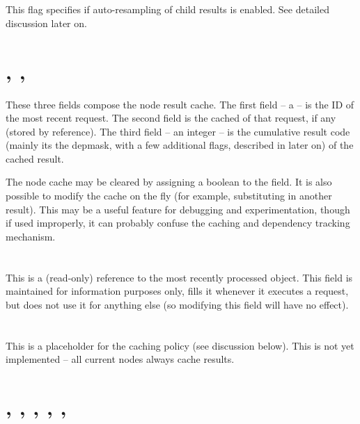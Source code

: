 \documentclass[10pt,twoside]{book}
\begin{document}
\section{}
  
  This flag specifies if auto-resampling of child results is enabled. See
  detailed discussion later on.

\section{, , }
  
  These three fields compose the node result cache. The first field -- a
   -- is the ID of the most recent request. The second field is the
  cached  of that request, if any (stored by reference). The third
  field -- an integer -- is the cumulative result code (mainly its the depmask,
  with a few additional flags, described in  later on) of the
  cached result.

  The node cache may be cleared by assigning a boolean  to the
   field. It is also possible to modify the cache on the fly
  (for example, substituting in another result). This may be a useful feature
  for debugging and experimentation, though if used improperly, it can probably
  confuse the caching and dependency tracking mechanism.  
  
\section{}

  This is a (read-only) reference to the most recently processed 
  object. This field is maintained for information purposes only, 
  fills it whenever it executes a request, but does not use it for anything
  else (so modifying this field will have no effect).

\section{}

  This is a placeholder for the caching policy (see discussion below). This is
  not yet implemented -- all current nodes always cache results.

\section{, , , 
            , , }
              
\end{document}

